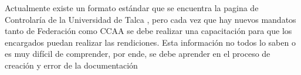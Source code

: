 
Actualmente existe un formato estándar que se encuentra la pagina de Controlaría de la Universidad de Talca \cite{6} , pero cada vez que hay nuevos mandatos tanto de Federación como CCAA se debe realizar una capacitación para que los encargados puedan realizar las rendiciones. Esta información no todos lo saben o es muy difícil de comprender, por ende, se debe aprender en el proceso de creación y error de la documentación